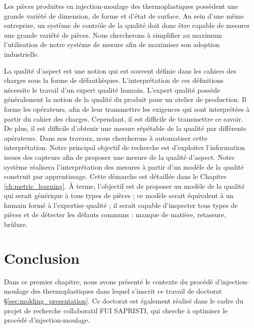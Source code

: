 Les pièces produites en injection-moulage des thermoplastiques possèdent une grande variété de dimension, de forme et d'état de surface.
Au sein d'une même entreprise, un système de contrôle de la qualité doit donc être capable de mesurer une grande variété de pièces.
Nous chercherons à simplifier au maximum l'utilisation de notre système de mesure afin de maximiser son adoption industrielle.   %

La qualité d'aspect est une notion qui est souvent définie dans les cahiers des charges sous la forme de défauthèques.
L'interprétation de ces définitions nécessite le travail d'un expert qualité humain.
L'expert qualité possède généralement la notion de la qualité du produit pour un atelier de production.
Il forme les opérateurs, afin de leur transmettre les exigences qui sont interprétées à partir du cahier des charges.
Cependant, il est difficile de transmettre ce savoir.
De plus, il est difficile d'obtenir une mesure répétable de la qualité par différents opérateurs.
Dans nos travaux, nous chercherons à automatiser cette interprétation.
Notre principal objectif de recherche est d'exploiter l'information issues des capteurs afin de proposer une mesure de la qualité d'aspect.
Notre système réalisera l'interprétation des mesures à partir d'un modèle de la qualité construit par apprentissage.
Cette démarche est détaillée dans le Chapitre \ref{ch:metric_learning}.
À terme, l'objectif est de proposer un modèle de la qualité qui serait générique à tous types de pièces ;
ce modèle serait équivalent à un humain formé à l'expertise qualité ; il serait capable d'inspecter tous types de pièces et de détecter les défauts communs : manque de matière, retassure, brûlure.


\section{Conclusion}
Dans ce premier chapitre, nous avons présenté le contexte du procédé d'injection-moulage des thermoplastiques dans lequel s’inscrit ce travail de doctorat §\ref{sec:molding_presentation}.
Ce doctorat est également réalisé dans le cadre du projet de recherche collaboratif FUI SAPRISTI, qui cherche à optimiser le procédé d'injection-moulage.

